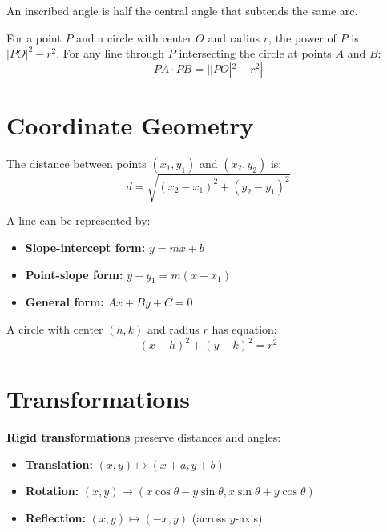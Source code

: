 \begin{theorem}
An inscribed angle is half the central angle that subtends the same arc.
\end{theorem}

\begin{theorem}
For a point $P$ and a circle with center $O$ and radius $r$, the power of $P$ is $|PO|^2 - r^2$. For any line through $P$ intersecting the circle at points $A$ and $B$:
\[PA \cdot PB = ||PO|^2 - r^2|\]
\end{theorem}

\section{Coordinate Geometry}

\begin{definition}
The distance between points $(x_1, y_1)$ and $(x_2, y_2)$ is:
\[d = \sqrt{(x_2 - x_1)^2 + (y_2 - y_1)^2}\]
\end{definition}

\begin{definition}
A line can be represented by:
\begin{itemize}
    \item \textbf{Slope-intercept form:} $y = mx + b$
    \item \textbf{Point-slope form:} $y - y_1 = m(x - x_1)$
    \item \textbf{General form:} $Ax + By + C = 0$
\end{itemize}
\end{definition}

\begin{definition}
A circle with center $(h, k)$ and radius $r$ has equation:
\[(x - h)^2 + (y - k)^2 = r^2\]
\end{definition}

\section{Transformations}

\begin{definition}
\textbf{Rigid transformations} preserve distances and angles:
\begin{itemize}
    \item \textbf{Translation:} $(x, y) \mapsto (x + a, y + b)$
    \item \textbf{Rotation:} $(x, y) \mapsto (x\cos\theta - y\sin\theta, x\sin\theta + y\cos\theta)$
    \item \textbf{Reflection:} $(x, y) \mapsto (-x, y)$ (across $y$-axis)
\end{itemize}
\end{definition}


